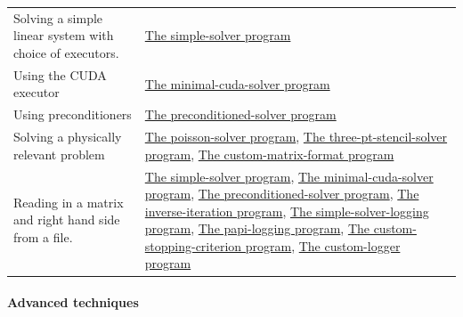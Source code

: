 \tabulinesep=1mm
\begin{longtabu} spread 0pt [c]{*{2}{|X[-1]}|}
\hline
Solving a simple linear system with choice of executors.  &\hyperlink{simple_solver}{The simple-\/solver program}  

\\
Using the C\+U\+DA executor  &\hyperlink{minimal_cuda_solver}{The minimal-\/cuda-\/solver program}  

\\
Using preconditioners  &\hyperlink{preconditioned_solver}{The preconditioned-\/solver program}  

\\
Solving a physically relevant problem  &\hyperlink{poisson_solver}{The poisson-\/solver program}, \hyperlink{three_pt_stencil_solver}{The three-\/pt-\/stencil-\/solver program}, \hyperlink{custom_matrix_format}{The custom-\/matrix-\/format program}  

\\
Reading in a matrix and right hand side from a file.  &\hyperlink{simple_solver}{The simple-\/solver program}, \hyperlink{minimal_cuda_solver}{The minimal-\/cuda-\/solver program}, \hyperlink{preconditioned_solver}{The preconditioned-\/solver program}, \hyperlink{inverse_iteration}{The inverse-\/iteration program}, \hyperlink{simple_solver_logging}{The simple-\/solver-\/logging program}, \hyperlink{papi_logging}{The papi-\/logging program}, \hyperlink{custom_stopping_criterion}{The custom-\/stopping-\/criterion program}, \hyperlink{custom_logger}{The custom-\/logger program}  

\\
\end{longtabu}


\paragraph*{{\bfseries Advanced techniques}}

